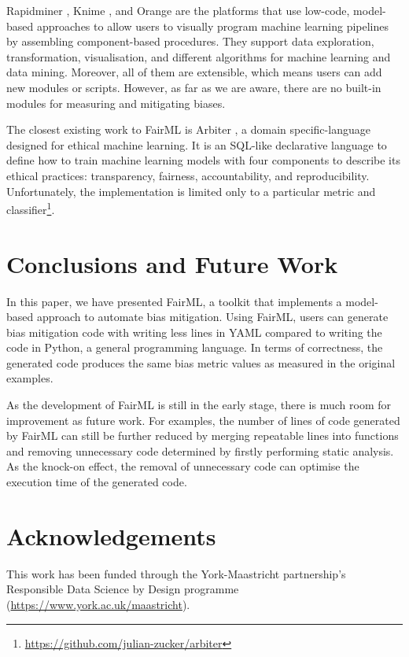 \documentclass[sigconf,review]{acmart}
\begin{document}
Rapidminer \cite{hofmann2016rapidminer}, Knime \cite{berthold2008knime}, and Orange \cite{demsar2013orange} are the platforms that use low-code, model-based approaches to allow users to visually program machine learning pipelines by assembling component-based procedures. They support data exploration, transformation, visualisation, and different algorithms for machine learning and data mining. Moreover, all of them are extensible, which means users can add new modules or scripts. However, as far as we are aware, there are no built-in modules for measuring and mitigating biases. 

The closest existing work to FairML is Arbiter \cite{zucker2020arbiter}, a domain specific-language designed for ethical machine learning. It is an SQL-like declarative language to define how to train machine learning models with four components to describe its ethical practices: transparency, fairness, accountability, and reproducibility. Unfortunately, the implementation is limited only to a particular metric and classifier\footnote{\url{https://github.com/julian-zucker/arbiter}}.

\section{Conclusions and Future Work}
\label{sec:conclusions_and_future_work}
In this paper, we have presented FairML, a toolkit that implements a model-based approach to automate bias mitigation. Using FairML, users can generate bias mitigation code with writing less lines in YAML compared to writing the code in Python, a general programming language.
In terms of correctness, the generated code produces the same bias metric values as measured in the original examples.

As the development of FairML is still in the early stage, 
there is much room for improvement as future work. For examples, the number of lines of code generated by FairML can still be further reduced by merging repeatable lines into functions and removing unnecessary code determined by firstly performing static analysis. 
As the knock-on effect, the removal of unnecessary code can optimise the execution time of the generated code. 


\section{Acknowledgements}
\label{sec:acknowledgements}
This work has been funded through the York-Maastricht
partnership’s Responsible Data Science by Design programme
(\url{https://www.york.ac.uk/maastricht}).
\end{document}
